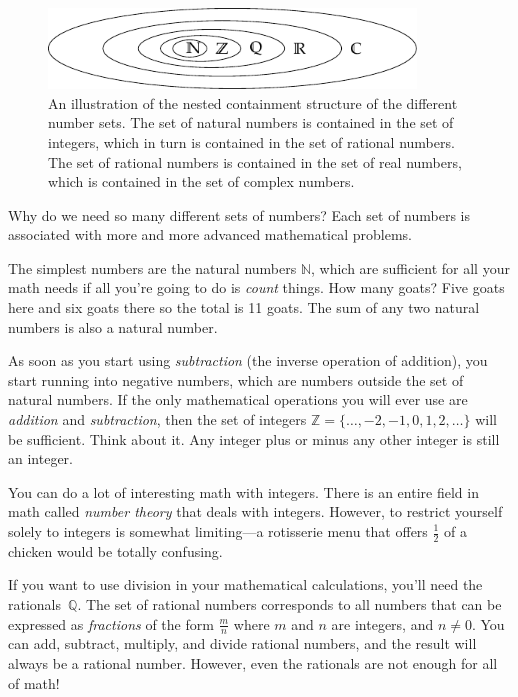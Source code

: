 		\begin{figure}[H]
			\centering
			\includegraphics[width=0.87\textwidth]{figures/math/nested_sets.pdf}
			\caption{	An illustration of the nested containment structure of the different number sets.
					The set of natural numbers is contained in the set of integers,
					which in turn is contained in the set of rational numbers.
					The set of rational numbers is contained in the set of real numbers,
					which is contained in the set of complex numbers.}
			\label{fig:nested_sets}
		\end{figure}

		\noindent
		Why do we need so many different sets of numbers?
		Each set of numbers is associated with more and more advanced mathematical problems.

		The simplest numbers are the natural numbers $\mathbb{N}$,
		which are sufficient for all your math needs if all you're going to do is \emph{count} things.
		How many goats? Five goats here and six goats there so the total is 11 goats. 
		The sum of any two natural numbers is also a natural number.

		As soon as you start using \emph{subtraction} (the inverse operation of addition),
		you start running into negative numbers,
		which are numbers outside the set of natural numbers.
		If the only mathematical operations you will ever use are \emph{addition} and \emph{subtraction},
		then the set of integers $\mathbb{Z} = \{ \ldots, -2, -1, 0, 1, 2, \ldots \}$ will be sufficient.
		Think about it.
		Any integer plus or minus any other integer is still an integer.

		You can do a lot of interesting math with integers.
		There is an entire field in math called \emph{number theory} that deals with integers.
		However, to restrict yourself solely to integers is somewhat limiting---a rotisserie
		menu that offers $\frac{1}{2}$ of a chicken would be totally confusing.

		If you want to use division in your mathematical calculations,														
		you'll need the rationals~$\mathbb{Q}$.
		The set of rational numbers corresponds to all numbers that can be expressed as \emph{fractions} of the form $\frac{m}{n}$		
		where $m$ and $n$ are integers, and $n \neq 0$.
		You can add, subtract, multiply, and divide rational numbers, and the result will always be a rational number.
		However, even the rationals are not enough for all of math!

